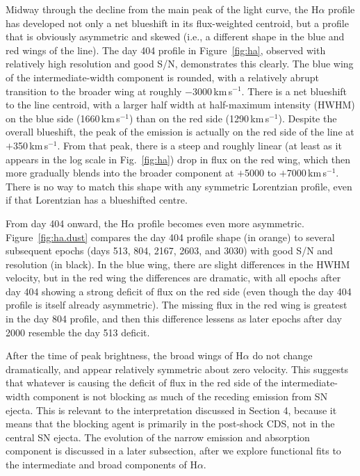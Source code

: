 \documentclass[fleqn,usenatbib,useAMS]{mnras}
\begin{document}
Midway through the decline from the main peak of the light curve, the
H$\alpha$ profile has developed not only a net blueshift in its
flux-weighted centroid, but a profile that is obviously asymmetric and
skewed (i.e., a different shape in the blue and red wings of the line).
The day 404 profile in Figure~\ref{fig:ha}, observed with relatively
high resolution and good S/N, demonstrates this clearly.
The blue wing of the intermediate-width component is rounded, with a
relatively abrupt transition to the broader wing at roughly $-$3000\,km\,s$^{-1}$.  There is a net blueshift to the line centroid, with a
larger half width at half-maximum intensity (HWHM) on the blue side (1660\,km\,s$^{-1}$) than on the red side (1290\,km\,s$^{-1}$).  Despite the overall
blueshift, the peak of the emission is actually on the red side of the
line at $+$350\,km\,s$^{-1}$.  From that peak, there is a steep and
roughly linear (at least as it appears in the log scale in
Fig.~\ref{fig:ha}) drop in flux on the red wing, which then more
gradually blends into the broader component at $+$5000 to $+$7000\,km\,s$^{-1}$.  There is no way to match this shape with any symmetric
Lorentzian profile, even if that Lorentzian has a blueshifted
centre.

From day 404 onward, the H$\alpha$ profile becomes even more
asymmetric.  Figure~\ref{fig:ha.dust} compares the day 404 profile
shape (in orange) to several subsequent epochs (days 513, 804, 2167, 2603, and 3030) with good S/N and resolution (in black).  In the
blue wing, there are slight differences in the HWHM velocity, but in
the red wing the differences are dramatic, with all epochs after day
404 showing a strong deficit of flux on the red side (even though the
day 404 profile is itself already asymmetric).  The missing flux in
the red wing is greatest in the day 804 profile, and then this
difference lessens as later epochs after day 2000 resemble the day 513
deficit.

After the time of peak brightness, the broad wings of H$\alpha$ do not change
dramatically, and appear relatively symmetric about zero velocity.
This suggests that whatever is causing the deficit of flux in the
red side of the intermediate-width component is not blocking as
much of the receding emission from SN ejecta.  This is relevant to
the interpretation discussed in Section 4, because it means that the
blocking agent is primarily in the post-shock CDS, not in the central SN
ejecta.  The evolution of the narrow emission and absorption component
is discussed in a later subsection, after we explore functional fits
to the intermediate and broad components of H$\alpha$.
\end{document}
